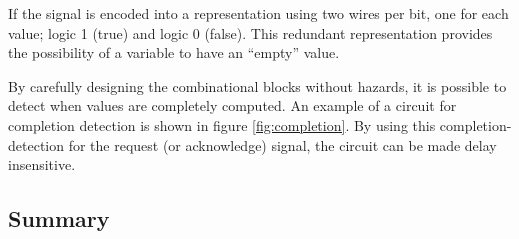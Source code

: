 If the signal is encoded into a representation using two wires per
bit, one for each value; logic 1 (true) and logic 0 (false). This
redundant representation provides the possibility of a variable to
have an ``empty'' value. 

By carefully designing the combinational blocks without hazards, it is
possible to detect when values are completely computed. An example of
a circuit for completion detection is shown in figure
\ref{fig:completion}. By using this completion-detection for the
request (or acknowledge) signal, the circuit can be made delay
insensitive.

\subsection{Summary}



